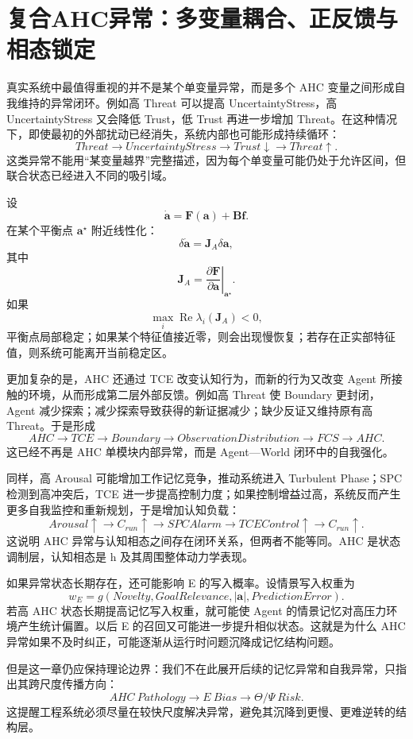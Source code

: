 \section{复合AHC异常：多变量耦合、正反馈与相态锁定}
\label{sec:compound_ahc_pathology}

真实系统中最值得重视的并不是某个单变量异常，而是多个 AHC 变量之间形成自我维持的异常闭环。例如高 Threat 可以提高 UncertaintyStress，高 UncertaintyStress 又会降低 Trust，低 Trust 再进一步增加 Threat。在这种情况下，即使最初的外部扰动已经消失，系统内部也可能形成持续循环：
\[
Threat
\rightarrow
UncertaintyStress
\rightarrow
Trust\downarrow
\rightarrow
Threat\uparrow.
\]
这类异常不能用“某变量越界”完整描述，因为每个单变量可能仍处于允许区间，但联合状态已经进入不同的吸引域。

设
\[
\dot{\mathbf a}
=
\mathbf F(\mathbf a)+\mathbf B\mathbf f.
\]
在某个平衡点 $\mathbf a^\star$ 附近线性化：
\[
\delta\dot{\mathbf a}
=
\mathbf J_A
\delta\mathbf a,
\]
其中
\[
\mathbf J_A
=
\left.
\frac{\partial\mathbf F}{\partial\mathbf a}
\right|_{\mathbf a^\star}.
\]
如果
\[
\max_i
\operatorname{Re}
\lambda_i(\mathbf J_A)
<0,
\]
平衡点局部稳定；如果某个特征值接近零，则会出现慢恢复；若存在正实部特征值，则系统可能离开当前稳定区。

更加复杂的是，AHC 还通过 TCE 改变认知行为，而新的行为又改变 Agent 所接触的环境，从而形成第二层外部反馈。例如高 Threat 使 Boundary 更封闭，Agent 减少探索；减少探索导致获得的新证据减少；缺少反证又维持原有高 Threat。于是形成
\[
AHC
\rightarrow
TCE
\rightarrow
Boundary
\rightarrow
ObservationDistribution
\rightarrow
FCS
\rightarrow
AHC.
\]
这已经不再是 AHC 单模块内部异常，而是 Agent—World 闭环中的自我强化。

同样，高 Arousal 可能增加工作记忆竞争，推动系统进入 Turbulent Phase；SPC 检测到高冲突后，TCE 进一步提高控制力度；如果控制增益过高，系统反而产生更多自我监控和重新规划，于是增加认知负载：
\[
Arousal\uparrow
\rightarrow
C_{run}\uparrow
\rightarrow
SPCAlarm
\rightarrow
TCEControl\uparrow
\rightarrow
C_{run}\uparrow.
\]
这说明 AHC 异常与认知相态之间存在闭环关系，但两者不能等同。AHC 是状态调制层，认知相态是 h 及其周围整体动力学表现。

如果异常状态长期存在，还可能影响 E 的写入概率。设情景写入权重为
\[
w_E
=
g
\left(
Novelty,
GoalRelevance,
|\mathbf a|,
PredictionError
\right).
\]
若高 AHC 状态长期提高记忆写入权重，就可能使 Agent 的情景记忆对高压力环境产生统计偏置。以后 E 的召回又可能进一步提升相似状态。这就是为什么 AHC 异常如果不及时纠正，可能逐渐从运行时问题沉降成记忆结构问题。

但是这一章仍应保持理论边界：我们不在此展开后续的记忆异常和自我异常，只指出其跨尺度传播方向：
\[
AHC\ Pathology
\rightarrow
E\ Bias
\rightarrow
\Theta/\Psi\ Risk.
\]
这提醒工程系统必须尽量在较快尺度解决异常，避免其沉降到更慢、更难逆转的结构层。

